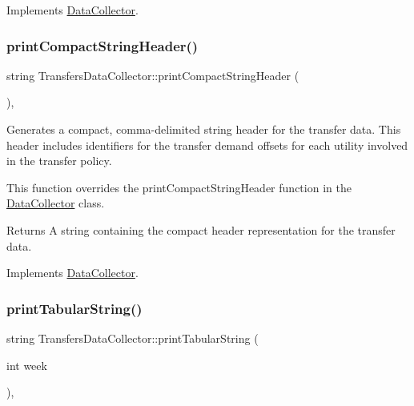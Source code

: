 Implements \mbox{\hyperlink{classDataCollector_a2eac264fa5612aed5a830b12de4f4ae3}{Data\+Collector}}.

\mbox{\label{classTransfersDataCollector_a29750b8b76fa82d70d4f472a0e36ceba}} 
\subsubsection{\texorpdfstring{print\+Compact\+String\+Header()}{printCompactStringHeader()}}
{\footnotesize\ttfamily string Transfers\+Data\+Collector\+::print\+Compact\+String\+Header (\begin{DoxyParamCaption}{ }\end{DoxyParamCaption})\hspace{0.3cm}{\ttfamily [override]}, {\ttfamily [virtual]}}



Generates a compact, comma-\/delimited string header for the transfer data. This header includes identifiers for the transfer demand offsets for each utility involved in the transfer policy. 

This function overrides the {\ttfamily print\+Compact\+String\+Header} function in the {\ttfamily \mbox{\hyperlink{classDataCollector}{Data\+Collector}}} class.

\begin{DoxyReturn}{Returns}
A string containing the compact header representation for the transfer data. 
\end{DoxyReturn}


Implements \mbox{\hyperlink{classDataCollector_a98dcb4ec871d9c7fbf7545c64e5ccc67}{Data\+Collector}}.

\mbox{\label{classTransfersDataCollector_a292b907e5c1000d8b3d868409637b9a6}} 
\subsubsection{\texorpdfstring{print\+Tabular\+String()}{printTabularString()}}
{\footnotesize\ttfamily string Transfers\+Data\+Collector\+::print\+Tabular\+String (\begin{DoxyParamCaption}\item[{int}]{week }\end{DoxyParamCaption})\hspace{0.3cm}{\ttfamily [override]}, {\ttfamily [virtual]}}



